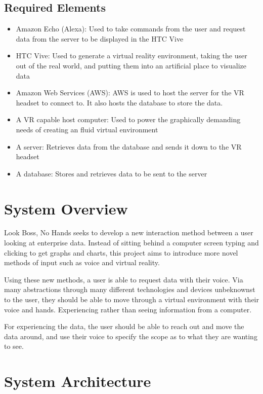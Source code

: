 \documentclass[onecolumn, draftclsnofoot,10pt, compsoc]{IEEEtran}
\begin{document}
    \subsection{Required Elements}  
        \begin{itemize}
            \item Amazon Echo (Alexa): Used to take commands from the user and request data from the server to be displayed in the HTC Vive
            \item HTC Vive: Used to generate a virtual reality environment, taking the user out of the real world, and putting them into an artificial place to visualize data
            \item Amazon Web Services (AWS): AWS is used to host the server for the VR headset to connect to. It also hosts the database to store the data. 
            \item A VR capable host computer: Used to power the graphically demanding needs of creating an fluid virtual environment
            \item A server: Retrieves data from the database and sends it down to the VR headset
            \item A database: Stores and retrieves data to be sent to the server
        \end{itemize}

\section{System Overview}
    Look Boss, No Hands seeks to develop a new interaction method between a user looking at enterprise data. Instead of sitting behind a computer screen typing and clicking to get graphs and charts, this project aims to introduce more novel methods of input such as voice and virtual reality. 
    
    Using these new methods, a user is able to request data with their voice. Via many abstractions through many different technologies and devices unbeknownst to the user, they should be able to move through a virtual environment with their voice and hands. Experiencing rather than seeing information from a computer.
    
    For experiencing the data, the user should be able to reach out and move the data around, and use their voice to specify the scope as to what they are wanting to see. 

\section {System Architecture}
\end{document}
